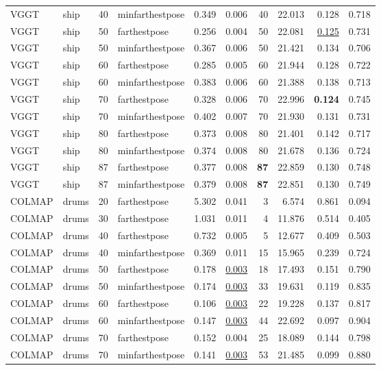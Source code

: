 \begin{table}[H]
\begin{tabular}{llrlrrrrrr}
VGGT & ship & 40 & minfarthestpose & 0.349 & 0.006 & 40 & 22.013 & 0.128 & 0.718 \\
VGGT & ship & 50 & farthestpose & 0.256 & 0.004 & 50 & 22.081 & \underline{0.125} & 0.731 \\
VGGT & ship & 50 & minfarthestpose & 0.367 & 0.006 & 50 & 21.421 & 0.134 & 0.706 \\
VGGT & ship & 60 & farthestpose & 0.285 & 0.005 & 60 & 21.944 & 0.128 & 0.722 \\
VGGT & ship & 60 & minfarthestpose & 0.383 & 0.006 & 60 & 21.388 & 0.138 & 0.713 \\
VGGT & ship & 70 & farthestpose & 0.328 & 0.006 & 70 & 22.996 & \textbf{0.124} & 0.745 \\
VGGT & ship & 70 & minfarthestpose & 0.402 & 0.007 & 70 & 21.930 & 0.131 & 0.731 \\
VGGT & ship & 80 & farthestpose & 0.373 & 0.008 & 80 & 21.401 & 0.142 & 0.717 \\
VGGT & ship & 80 & minfarthestpose & 0.374 & 0.008 & 80 & 21.678 & 0.136 & 0.724 \\
VGGT & ship & 87 & farthestpose & 0.377 & 0.008 & \textbf{87} & 22.859 & 0.130 & 0.748 \\
VGGT & ship & 87 & minfarthestpose & 0.379 & 0.008 & \textbf{87} & 22.851 & 0.130 & 0.749 \\
\midrule
COLMAP & drums & 20 & farthestpose & 5.302 & 0.041 & 3 & 6.574 & 0.861 & 0.094 \\
COLMAP & drums & 30 & farthestpose & 1.031 & 0.011 & 4 & 11.876 & 0.514 & 0.405 \\
COLMAP & drums & 40 & farthestpose & 0.732 & 0.005 & 5 & 12.677 & 0.409 & 0.503 \\
COLMAP & drums & 40 & minfarthestpose & 0.369 & 0.011 & 15 & 15.965 & 0.239 & 0.724 \\
COLMAP & drums & 50 & farthestpose & 0.178 & \underline{0.003} & 18 & 17.493 & 0.151 & 0.790 \\
COLMAP & drums & 50 & minfarthestpose & 0.174 & \underline{0.003} & 33 & 19.631 & 0.119 & 0.835 \\
COLMAP & drums & 60 & farthestpose & 0.106 & \underline{0.003} & 22 & 19.228 & 0.137 & 0.817 \\
COLMAP & drums & 60 & minfarthestpose & 0.147 & \underline{0.003} & 44 & 22.692 & 0.097 & 0.904 \\
COLMAP & drums & 70 & farthestpose & 0.152 & 0.004 & 25 & 18.089 & 0.144 & 0.798 \\
COLMAP & drums & 70 & minfarthestpose & 0.141 & \underline{0.003} & 53 & 21.485 & 0.099 & 0.880 \\

\end{tabular}
\end{table}

